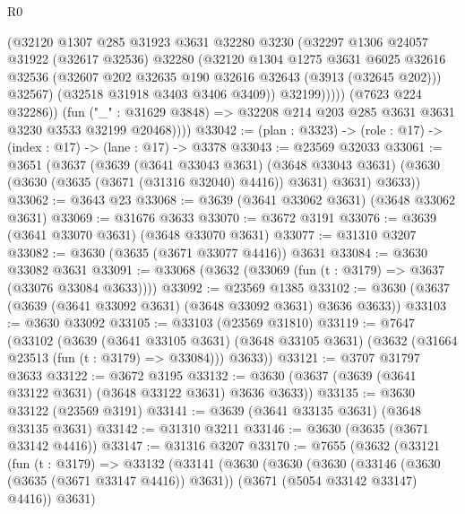 \begin{lexlean}{R0}
\begin{coremodule}
                    (@32120
                      @1307
                      @285
                      @31923
                      @3631
                      @32280
                      @3230
                      (@32297
                        @1306
                        @24057
                        @31922
                        (@32617 @32536)
                        @32280
                        (@32120
                          @1304
                          @1275
                          @3631
                          @6025
                          @32616
                          @32536
                          (@32607 @202 @32635 @190 @32616 @32643 (@3913 (@32645 @202)))
                          @32567)
                        (@32518 @31918 @3403 @3406 @3409))
                      @32199)))))
            (@7623 @224 @32286))
          (fun ("_" : @31629 @3848) =>
          @32208 @214 @203 @285 @3631 @3631 @3230 @3533 @32199 @20468))))
@33042 := (plan : @3323) -> (role : @17) -> (index : @17) -> (lane : @17) -> @3378
@33043 := @23569 @32033
@33061 := @3651
    (@3637
      (@3639
        (@3641 @33043 @3631)
        (@3648 @33043 @3631)
        (@3630 (@3630 (@3635 (@3671 (@31316 @32040) @4416)) @3631) @3631)
        @3633))
@33062 := @3643 @23
@33068 := @3639 (@3641 @33062 @3631) (@3648 @33062 @3631)
@33069 := @31676 @3633
@33070 := @3672 @3191
@33076 := @3639 (@3641 @33070 @3631) (@3648 @33070 @3631)
@33077 := @31310 @3207
@33082 := @3630 (@3635 (@3671 @33077 @4416)) @3631
@33084 := @3630 @33082 @3631
@33091 := @33068 (@3632 (@33069 (fun (t : @3179) => @3637 (@33076 @33084 @3633))))
@33092 := @23569 @1385
@33102 := @3630 (@3637 (@3639 (@3641 @33092 @3631) (@3648 @33092 @3631) @3636 @3633))
@33103 := @3630 @33092
@33105 := @33103 (@23569 @31810)
@33119 := @7647
    (@33102
      (@3639
        (@3641 @33105 @3631)
        (@3648 @33105 @3631)
        (@3632 (@31664 @23513 (fun (t : @3179) => @33084)))
        @3633))
@33121 := @3707 @31797 @3633
@33122 := @3672 @3195
@33132 := @3630 (@3637 (@3639 (@3641 @33122 @3631) (@3648 @33122 @3631) @3636 @3633))
@33135 := @3630 @33122 (@23569 @3191)
@33141 := @3639 (@3641 @33135 @3631) (@3648 @33135 @3631)
@33142 := @31310 @3211
@33146 := @3630 (@3635 (@3671 @33142 @4416))
@33147 := @31316 @3207
@33170 := @7655
    (@3632
      (@33121
        (fun (t : @3179) =>
        @33132
          (@33141
            (@3630
              (@3630
                (@3630
                  (@33146 (@3630 (@3635 (@3671 @33147 @4416)) @3631))
                  (@3671 (@5054 @33142 @33147) @4416))
                @3631)

\end{coremodule}
\end{lexlean}
